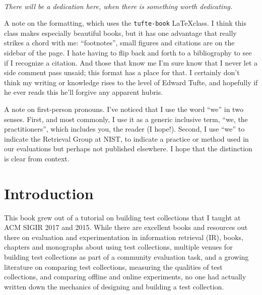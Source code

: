 \documentclass[nobib]{tufte-book}
\begin{document}
\setcounter{tocdepth}{1}
\tableofcontents



\cleardoublepage
~\vfill
\begin{doublespace}
\noindent\fontsize{18}{22}\selectfont\itshape
\nohyphenation
There will be a dedication here, when there is something worth dedicating.
\end{doublespace}
\vfill
\vfill

A note on the formatting, which uses the {\tt tufte-book} \LaTeX class.  I think this class makes especially beautiful books, but it has one advantage that really strikes a chord with me: ``footnotes'', small figures and citations are on the sidebar of the page.  I hate having to flip back and forth to a bibliography to see if I recognize a citation.  And those that know me I'm sure know that I never let a side comment pass unsaid; this format has a place for that.  I certainly don't think my writing or knowledge rises to the level of Edward Tufte, and hopefully if he ever reads this he'll forgive any apparent hubris.

A note on first-person pronouns.  I've noticed that I use the word ``we'' in two senses. First, and most commonly, I use it as a generic inclusive term, ``we, the practitioners'', which includes you, the reader (I hope!).  Second, I use ``we'' to indicate the Retrieval Group at NIST, to indicate a practice or method used in our evaluations but perhaps not published elsewhere.  I hope that the distinction is clear from context.

\cleardoublepage
\chapter*{Introduction}

This book grew out of a tutorial on building test collections that I taught at ACM SIGIR 2017 and 2015.  While there are excellent books and resources out there on evaluation and experimentation in information retrieval (IR), books, chapters and monographs about using test collections, multiple venues for building test collections as part of a community evaluation task, and a growing literature on comparing test collections, measuring the qualities of test collections, and comparing offline and online experiments, no one had actually written down the mechanics of designing and building a test collection.
\end{document}
